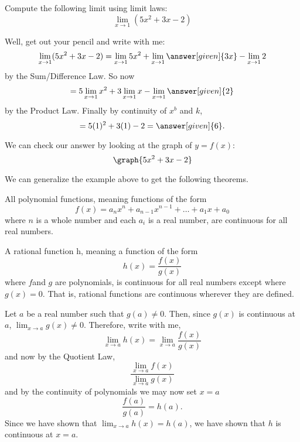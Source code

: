 \documentclass{ximera}
\begin{document}
\begin{example}
  Compute the following limit using limit laws:
  \[
  \lim_{x\to 1}(5x^2+3x-2)
  \]
\begin{explanation}
  Well, get out your pencil and write with me:
  \[
  \lim_{x\to 1} (5x^2+3x-2) = \lim_{x\to 1} 5x^2 + \lim_{x\to 1} \answer[given]{3x} - \lim_{x\to 1}2
  \]
  by the Sum/Difference Law. So now
  \[
  = 5\lim_{x\to 1} x^2 + 3\lim_{x\to 1} x - \lim_{x\to 1}\answer[given]{2}
  \]
  by the Product Law. Finally by continuity of $x^b$ and $k$,
  \[
  = 5(1)^2 + 3(1) - 2 =\answer[given]{6}.
  \]
  \begin{onlineOnly}
    We can check our answer by looking at the graph of $y=f(x)$:
    \[
    \graph{5x^2+3x-2}
    \]
  \end{onlineOnly}
\end{explanation}  
\end{example}

We can generalize the example above to get the following theorems.

\begin{theorem}
  All polynomial functions, meaning functions of the form
  \[
  f(x) = a_nx^n + a_{n-1}x^{n-1} + \dots + a_1 x + a_0
  \]
  where $n$ is a whole number and each $a_i$ is a real number, are
  continuous for all real numbers.
\end{theorem}

\begin{theorem}
   A rational function h, meaning a function of the form 
  \[
  h(x)=\frac{f(x)}{g(x)}
  \]
  where $f $and $g$ are polynomials, is continuous for all real numbers except where $g(x)=0$.  That is,
  rational functions are continuous wherever they are defined.
\begin{explanation}
      Let $a$ be a real number such that $g(a)\neq 0$.  Then, since
      $g(x)$ is continuous at $a$, $\lim_{x\to a} g(x) \neq 0$.
      Therefore, write with me, 
      \[
      \lim_{x \to a} h(x) = \lim_{x\to a} \frac{f(x)}{g(x)}
      \]
      and now by the Quotient Law, 
      \[
      \frac{\lim_{x\to a} f(x)}{ \lim_{x\to a} g(x)}
      \]
      and by the continuity of polynomials we may now set $x=a$
      \[
      \frac{f(a)}{g(a)}=h(a).
      \]
      Since we have shown that $\lim_{x\to a} h(x) = h(a)$, we have
      shown that $h$ is continuous at $x=a$.
\end{explanation}
\end{theorem}
\end{document}
